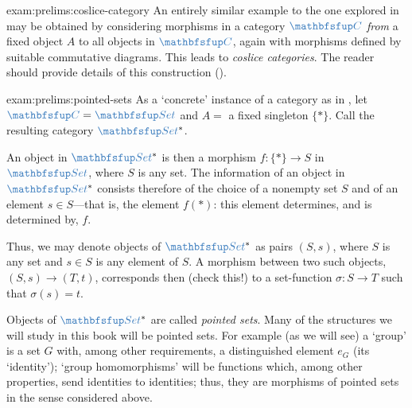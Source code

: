 \begin{exam}{}{exam:prelims:coslice-category}
  An entirely similar example to the one explored in
   may be obtained by considering
  morphisms in a category $\categ{C}$ \emph{from} a fixed object $A$
  to all objects in $\categ{C}$, again with morphisms defined by
  suitable commutative diagrams. This leads to \emph{coslice
    categories}. The reader should provide details of this
  construction ().
\end{exam}

\begin{exam}{}{exam:prelims:pointed-sets}
  As a `concrete' instance of a category as in
  , let $\categ{C} = \categ{Set}$
  and $A = $ a fixed singleton $\{*\}$. Call the resulting category
  $\categ{Set}^*$.

  An object in $\categ{Set}^*$ is then a morphism $f : \{*\} \to S$ in
  $\categ{Set}$, where $S$ is any set. The information of an object in
  $\categ{Set}^*$ consists therefore of the choice of a nonempty set
  $S$ and of an element $s \in S$---that is, the element $f(*)$: this
  element determines, and is determined by, $f$.

  Thus, we may denote objects of $\categ{Set}^*$ as pairs $(S, s)$,
  where $S$ is any set and $s \in S$ is any element of $S$. A morphism
  between two such objects, $(S, s) \to (T, t)$, corresponds then
  (check this!) to a set-function $\sigma : S \to T$ such that
  $\sigma(s) = t$.

  Objects of $\categ{Set}^*$ are called \emph{pointed sets}. Many of
  the structures we will study in this book will be pointed sets. For
  example (as we will see) a `group' is a set $G$ with, among other
  requirements, a distinguished element $e_G$ (its `identity'); `group
  homomorphisms' will be functions which, among other properties, send
  identities to identities; thus, they are morphisms of pointed sets
  in the sense considered above.
\end{exam}

